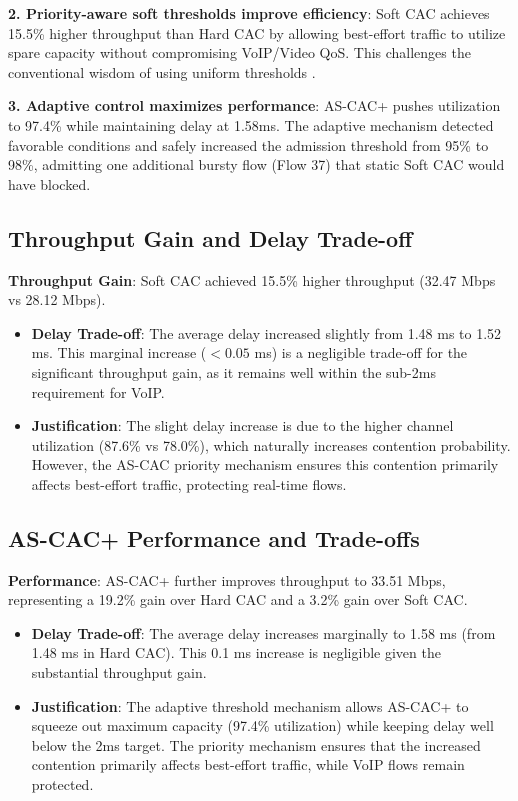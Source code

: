 \documentclass[conference]{IEEEtran}
\begin{document}
\textbf{2. Priority-aware soft thresholds improve efficiency}: Soft CAC achieves 15.5\% higher throughput than Hard CAC by allowing best-effort traffic to utilize spare capacity without compromising VoIP/Video QoS. This challenges the conventional wisdom of using uniform thresholds \cite{10}.

\textbf{3. Adaptive control maximizes performance}: AS-CAC+ pushes utilization to 97.4\% while maintaining delay at 1.58ms. The adaptive mechanism detected favorable conditions and safely increased the admission threshold from 95\% to 98\%, admitting one additional bursty flow (Flow 37) that static Soft CAC would have blocked.

\subsection{Throughput Gain and Delay Trade-off}

\textbf{Throughput Gain}: Soft CAC achieved 15.5\% higher throughput (32.47 Mbps vs 28.12 Mbps).

\begin{itemize}
    \item \textbf{Delay Trade-off}: The average delay increased slightly from 1.48 ms to 1.52 ms. This marginal increase ($< 0.05$ ms) is a negligible trade-off for the significant throughput gain, as it remains well within the sub-2ms requirement for VoIP.
    \item \textbf{Justification}: The slight delay increase is due to the higher channel utilization (87.6\% vs 78.0\%), which naturally increases contention probability. However, the AS-CAC priority mechanism ensures this contention primarily affects best-effort traffic, protecting real-time flows.
\end{itemize}

\subsection{AS-CAC+ Performance and Trade-offs}

\textbf{Performance}: AS-CAC+ further improves throughput to 33.51 Mbps, representing a 19.2\% gain over Hard CAC and a 3.2\% gain over Soft CAC.

\begin{itemize}
    \item \textbf{Delay Trade-off}: The average delay increases marginally to 1.58 ms (from 1.48 ms in Hard CAC). This 0.1 ms increase is negligible given the substantial throughput gain.
    \item \textbf{Justification}: The adaptive threshold mechanism allows AS-CAC+ to squeeze out maximum capacity (97.4\% utilization) while keeping delay well below the 2ms target. The priority mechanism ensures that the increased contention primarily affects best-effort traffic, while VoIP flows remain protected.
\end{itemize}
\end{document}
